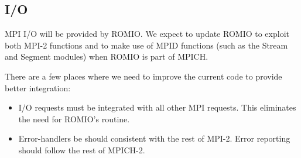 \documentclass{article}
\begin{document}
\subsection{I/O}
\label{sec:io}
MPI I/O will be provided by ROMIO.  We expect to update ROMIO to exploit both
MPI-2 functions and to make use of MPID functions (such as the Stream and
Segment modules) when ROMIO is part of MPICH.

There are a few places where we need to improve the current code to provide
better integration:
\begin{itemize}
\item I/O requests must be integrated with all other MPI requests.  This
  eliminates the need for ROMIO's  routine.
\item Error-handlers be should consistent with the rest of MPI-2.
  Error reporting 
  should follow the rest of MPICH-2.
\end{itemize}
\end{document}
